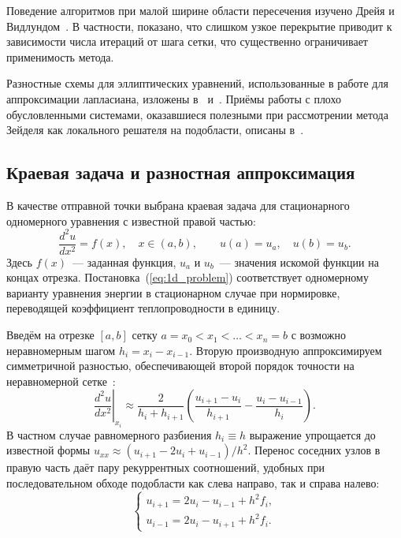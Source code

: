 Поведение алгоритмов при малой ширине области пересечения изучено Дрейя и
Видлундом~\cite{dryja1994}. В частности, показано, что слишком узкое
перекрытие приводит к зависимости числа итераций от шага сетки, что
существенно ограничивает применимость метода.

Разностные схемы для эллиптических уравнений, использованные в работе для
аппроксимации лапласиана, изложены в~\cite{samarskii2001} и~\cite{bahvalov2003}.
Приёмы работы с плохо обусловленными системами, оказавшиеся полезными при
рассмотрении метода Зейделя как локального решателя на подобласти, описаны
в~\cite{golub2012}.


\subsection{Краевая задача и разностная аппроксимация}

В качестве отправной точки выбрана краевая задача для стационарного
одномерного уравнения с известной правой частью:
\begin{equation}\label{eq:1d_problem}
    \frac{d^2 u}{d x^2} = f(x),\quad x\in(a,b),
    \qquad u(a)=u_a,\quad u(b)=u_b.
\end{equation}
Здесь $f(x)$~--- заданная функция, $u_a$ и $u_b$~--- значения искомой функции
на концах отрезка. Постановка~(\ref{eq:1d_problem}) соответствует
одномерному варианту уравнения энергии в стационарном случае при
нормировке, переводящей коэффициент теплопроводности в единицу.

Введём на отрезке $[a,b]$ сетку $a=x_0<x_1<\dots<x_n=b$ с возможно
неравномерным шагом $h_i=x_i-x_{i-1}$. Вторую производную аппроксимируем
симметричной разностью, обеспечивающей второй порядок точности на
неравномерной сетке~\cite{samarskii2001}:
\begin{equation}\label{eq:central_diff}
    \left.\frac{d^2 u}{d x^2}\right|_{x_i}
    \approx \frac{2}{h_i + h_{i+1}}
        \left(\frac{u_{i+1}-u_i}{h_{i+1}} - \frac{u_i-u_{i-1}}{h_i}\right).
\end{equation}
В частном случае равномерного разбиения $h_i\equiv h$ выражение упрощается до
известной формы $u_{xx}\approx (u_{i+1}-2u_i+u_{i-1})/h^2$. Перенос соседних
узлов в правую часть даёт пару рекуррентных соотношений, удобных при
последовательном обходе подобласти как слева направо, так и справа налево:
\begin{equation}\label{eq:recur}
    \begin{cases}
        u_{i+1} = 2u_i - u_{i-1} + h^2 f_i, \\[8pt]
        u_{i-1} = 2u_i - u_{i+1} + h^2 f_i.
    \end{cases}
\end{equation}

